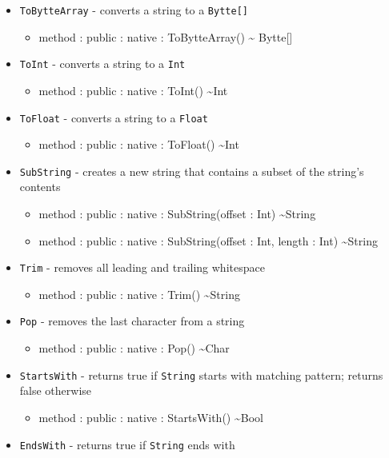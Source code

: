 \documentclass[11pt]{article}
\begin{document}
\begin{itemize}
\item \texttt{ToBytteArray} - converts a string to a \texttt{Bytte[]}
  \begin{itemize}
  \item method : public : native : ToBytteArray() \textasciitilde
    Bytte[]
  \end{itemize}
\item \texttt{ToInt} - converts a string to a \texttt{Int}
  \begin{itemize}
  \item method : public : native : ToInt() \textasciitilde Int
  \end{itemize}
\item \texttt{ToFloat} - converts a string to a \texttt{Float}
  \begin{itemize}
  \item method : public : native : ToFloat() \textasciitilde Int
  \end{itemize}
\item \texttt{SubString} - creates a new string that contains a subset
  of the string's contents
  \begin{itemize}
  \item method : public : native : SubString(offset : Int)
    \textasciitilde String
  \item method : public : native : SubString(offset : Int, length :
    Int) \textasciitilde String
  \end{itemize}
\item \texttt{Trim} - removes all leading and trailing whitespace
  \begin{itemize}
  \item method : public : native : Trim() \textasciitilde String
  \end{itemize}
\item \texttt{Pop} - removes the last character from a string
  \begin{itemize}
  \item method : public : native : Pop() \textasciitilde Char
  \end{itemize}
\item \texttt{StartsWith} - returns true if \texttt{String} starts
  with matching pattern; returns false otherwise
  \begin{itemize}
  \item method : public : native : StartsWith() \textasciitilde Bool
  \end{itemize}
\item \texttt{EndsWith} - returns true if \texttt{String} ends with

\end{itemize}
\end{document}
